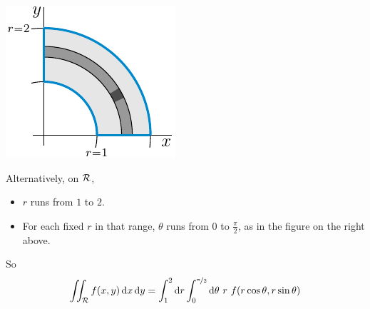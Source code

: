\begin{solution}
\begin{center}
     \includegraphics{fig/polar5b3.pdf}
\end{center}
Alternatively, on $\mathcal{R}$,
\begin{itemize}
\item 
$r$ runs from $1$ to $2$. 
\item
For each fixed $r$ in that range, $\theta$ runs from $0$ to $\frac{\pi}{2}$,
as in the figure on the right above.
\end{itemize}
So 
\begin{equation*}
\iint_{\mathcal{R}} f(x,y)\,\mathrm{d}x\,\mathrm{d}y
=\int_1^2\mathrm{d}r
  \int_0^{\nicefrac{\pi}{2}}\mathrm{d}\theta
 \ r\ f(r\cos\theta,r\sin\theta)
\end{equation*}


\end{solution}
